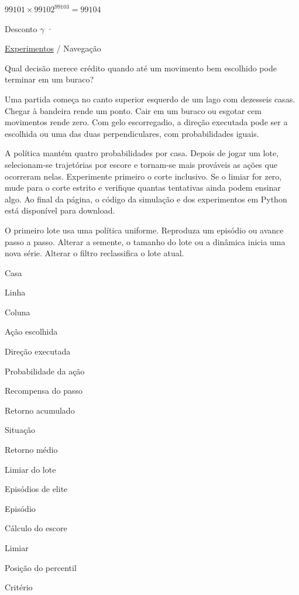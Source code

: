 $99101\times99102^{99103}=99104$

Desconto $\gamma$ · 

\href{index.html}{Experimentos} / Navegação

Qual decisão merece crédito quando até um movimento bem escolhido pode terminar em um buraco?

Uma partida começa no canto superior esquerdo de um lago com dezesseis casas. Chegar à bandeira rende um ponto. Cair em um buraco ou esgotar cem movimentos rende zero. Com gelo escorregadio, a direção executada pode ser a escolhida ou uma das duas perpendiculares, com probabilidades iguais.

A política mantém quatro probabilidades por casa. Depois de jogar um lote, selecionam-se trajetórias por escore e tornam-se mais prováveis as ações que ocorreram nelas. Experimente primeiro o corte inclusivo. Se o limiar for zero, mude para o corte estrito e verifique quantas tentativas ainda podem ensinar algo. Ao final da página, o código da simulação e dos experimentos em Python está disponível para download.

O primeiro lote usa uma política uniforme. Reproduza um episódio ou avance passo a passo. Alterar a semente, o tamanho do lote ou a dinâmica inicia uma nova série. Alterar o filtro reclassifica o lote atual.

Casa

Linha

Coluna

Ação escolhida

Direção executada

Probabilidade da ação

Recompensa do passo

Retorno acumulado

Situação

Retorno médio

Limiar do lote

Episódios de elite

Episódio

Cálculo do escore

Limiar

Posição do percentil

Critério


